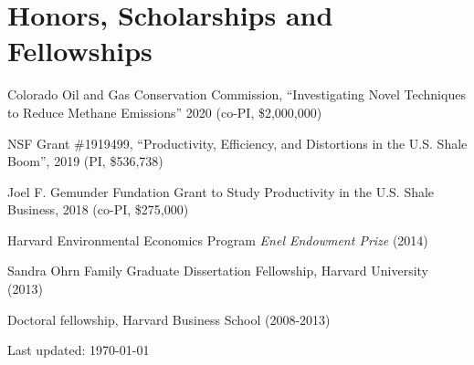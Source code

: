 \documentclass[10pt,letterpaper]{article}
\renewenvironment{itemize}{
  \begin{list}{}{
    \setlength{\leftmargin}{1.5em}
    \setlength{\itemsep}{0.25em}
    \setlength{\parskip}{0pt}
    \setlength{\parsep}{0.25em}
  }
}{
  \end{list}
}
\begin{document}
\section*{Honors, Scholarships and Fellowships}
\begin{itemize}
  \item Colorado Oil and Gas Conservation Commission, ``Investigating Novel Techniques to Reduce Methane Emissions'' 2020 (co-PI, \$2,000,000)
  \item NSF Grant \#1919499, ``Productivity, Efficiency, and Distortions in the U.S. Shale Boom'', 2019 (PI, \$536,738)
  \item Joel F. Gemunder Fundation Grant to Study Productivity in the U.S. Shale Business, 2018 (co-PI, \$275,000)
  \item Harvard Environmental Economics Program \textit{Enel Endowment Prize} (2014)
  \item Sandra Ohrn Family Graduate Dissertation Fellowship, Harvard University (2013)
  \item Doctoral fellowship, Harvard Business School (2008-2013)
\end{itemize}


\medskip
\begin{center}
  \begin{small}
    Last updated: \today
  \end{small}
\end{center}
\end{document}
